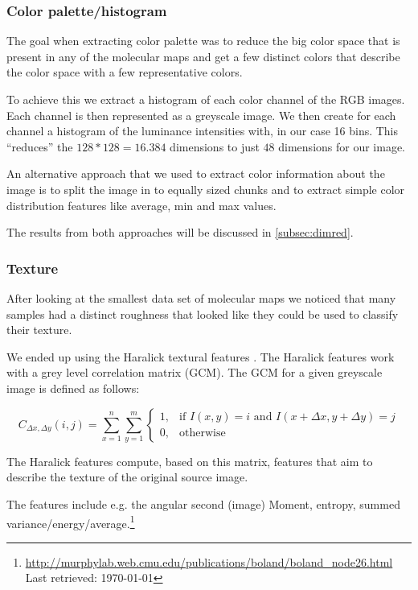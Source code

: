 \documentclass[journal]{vgtc}       %
\newcommand{\todo}[1]{\textcolor{red}{\textbf{TODO:} #1}}
\begin{document}
\subsubsection{Color palette/histogram }

The goal when extracting color palette was to reduce the big color space that is present in any of the molecular maps and get a few distinct  colors that describe the color space with a few representative colors.

To achieve this we extract a histogram of each color channel of the RGB images. Each channel is then represented as a greyscale image. We then create for each channel a histogram of the luminance intensities with, in our case 16 bins. This ``reduces'' the \(128*128 = 16.384\) dimensions to just \(48\) dimensions for our image.

An alternative approach that we used to extract color information about the image is to split the image in to equally sized chunks and to extract simple color distribution features like average, min and max values.

The results from both approaches will be discussed in \ref{subsec:dimred}.

\subsubsection{Texture}
After looking at the smallest data set of molecular maps we noticed that many samples had a distinct roughness that looked like they could be used to classify their texture.

We ended up using the Haralick textural features \cite{haralick}. The Haralick features work with a grey level correlation matrix (GCM). The GCM for a given greyscale image is defined as follows:

\[{\displaystyle C_{\Delta x,\Delta y}(i,j)=\sum _{x=1}^{n}\sum _{y=1}^{m}{\begin{cases}1,&{\text{if }}I(x,y)=i{\text{ and }}I(x+\Delta x,y+\Delta y)=j\\0,&{\text{otherwise}}\end{cases}}}\]

The Haralick features compute, based on this matrix, features that aim to describe the texture of the original source image.

The features include e.g. the angular second (image) Moment, entropy, summed variance/energy/average.\footnote{\url{http://murphylab.web.cmu.edu/publications/boland/boland_node26.html} \\ Last retrieved: \today}
\end{document}
